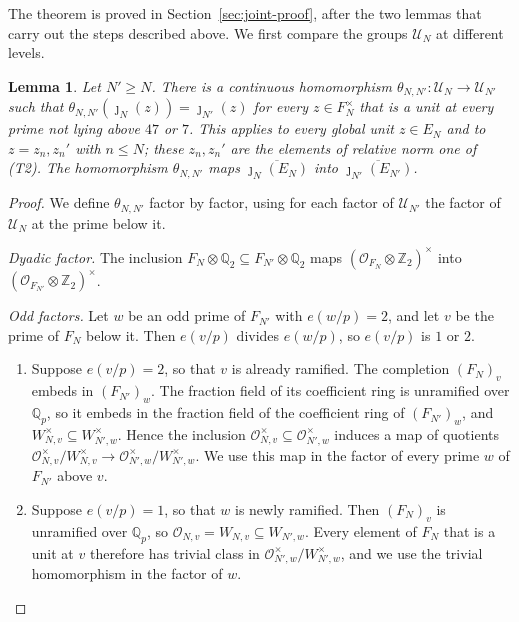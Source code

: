 \documentclass[11pt]{article}
\theoremstyle{plain}
\newtheorem{lemma}[theorem]{Lemma}
\theoremstyle{definition}
\theoremstyle{remark}
\newcommand{\Z}{\mathbb Z}
\newcommand{\Q}{\mathbb Q}
\newcommand{\OO}{\mathcal O}
\begin{document}
The theorem is proved in Section~\ref{sec:joint-proof}, after the two
lemmas that carry out the steps described above.  We first compare the
groups $\mathcal U_N$ at different levels.

\begin{lemma}\label{lem:propagation}
Let $N'\geq N$.  There is a continuous homomorphism
$\theta_{N,N'}:\mathcal U_N\to\mathcal U_{N'}$ such that
$\theta_{N,N'}(\jmath_N(z))=\jmath_{N'}(z)$ for every $z\in F_N^\times$
that is a unit at every prime not lying above $47$ or $7$.  This applies
to every global unit $z\in E_N$ and to $z=z_n,z_n'$ with $n\le N$; these
$z_n,z_n'$ are the elements of relative norm one of \textup{(T2)}.  The homomorphism
$\theta_{N,N'}$ maps $\overline{\jmath_N(E_N)}$ into
$\overline{\jmath_{N'}(E_{N'})}$.
\end{lemma}
\begin{proof}
We define $\theta_{N,N'}$ factor by factor, using for each factor of
$\mathcal U_{N'}$ the factor of $\mathcal U_N$ at the prime below it.

\emph{Dyadic factor.}  The inclusion
$F_N\otimes\Q_2\subseteq F_{N'}\otimes\Q_2$ maps
$(\OO_{F_N}\otimes\Z_2)^\times$ into $(\OO_{F_{N'}}\otimes\Z_2)^\times$.

\emph{Odd factors.}  Let $w$ be an odd prime of $F_{N'}$ with $e(w/p)=2$,
and let $v$ be the prime of $F_N$ below it.  Then $e(v/p)$ divides
$e(w/p)$, so $e(v/p)$ is $1$ or $2$.
\begin{enumerate}
\item[(a)] Suppose $e(v/p)=2$, so that $v$ is already ramified.  The
completion $(F_N)_v$ embeds in $(F_{N'})_w$.  The fraction field of its
coefficient ring is unramified over $\Q_p$, so it embeds in the fraction
field of the coefficient ring of $(F_{N'})_w$, and $W_{N,v}^\times\subseteq W_{N',w}^\times$.  Hence the
inclusion $\OO_{N,v}^\times\subseteq\OO_{N',w}^\times$ induces a map of
quotients $\OO_{N,v}^\times/W_{N,v}^\times\to
\OO_{N',w}^\times/W_{N',w}^\times$.  We use this map in the factor of
every prime $w$ of $F_{N'}$ above $v$.
\item[(b)] Suppose $e(v/p)=1$, so that $w$ is newly ramified.  Then
$(F_N)_v$ is unramified over $\Q_p$, so $\OO_{N,v}=W_{N,v}\subseteq
W_{N',w}$.  Every element of $F_N$ that is a unit at $v$ therefore has
trivial class in $\OO_{N',w}^\times/W_{N',w}^\times$, and we use the
trivial homomorphism in the factor of $w$.
\end{enumerate}


\end{proof}
\end{document}
